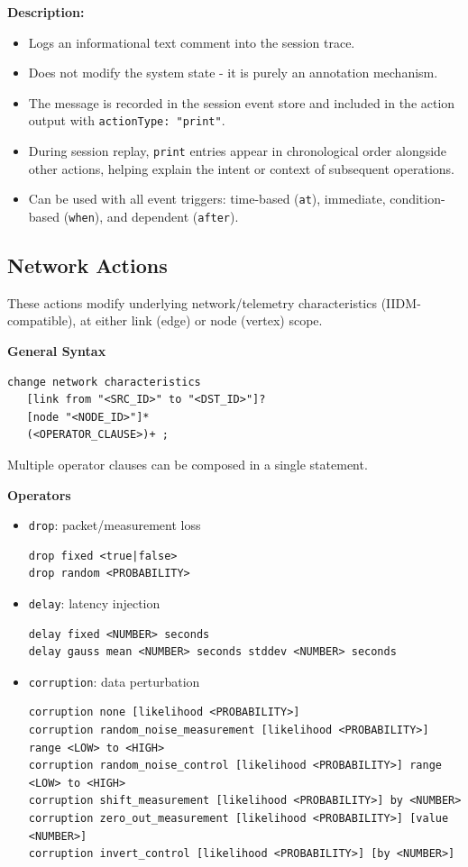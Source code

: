 \documentclass[12pt]{article}
\begin{document}
\textbf{Description:}
\begin{itemize}
  \item Logs an informational text comment into the session trace.
  \item Does not modify the system state - it is purely an annotation mechanism.
  \item The message is recorded in the session event store and included in the action output with
        \texttt{actionType: "print"}.
  \item During session replay, \texttt{print} entries appear in chronological order alongside other actions,
        helping explain the intent or context of subsequent operations.
  \item Can be used with all event triggers: time-based (\texttt{at}), immediate, condition-based
        (\texttt{when}), and dependent (\texttt{after}).
\end{itemize}

\subsection{Network Actions}

These actions modify underlying network/telemetry characteristics (IIDM-compatible), at either link (edge) or node
(vertex) scope.

\textbf{General Syntax}

\begin{lstlisting}
change network characteristics
   [link from "<SRC_ID>" to "<DST_ID>"]?
   [node "<NODE_ID>"]*
   (<OPERATOR_CLAUSE>)+ ;
\end{lstlisting}

Multiple operator clauses can be composed in a single statement.

\textbf{Operators}

\begin{itemize}
  \item \texttt{drop}: packet/measurement loss
\begin{lstlisting}
drop fixed <true|false>
drop random <PROBABILITY>
\end{lstlisting}

  \item \texttt{delay}: latency injection
\begin{lstlisting}
delay fixed <NUMBER> seconds
delay gauss mean <NUMBER> seconds stddev <NUMBER> seconds
\end{lstlisting}

  \item \texttt{corruption}: data perturbation
\begin{lstlisting}
corruption none [likelihood <PROBABILITY>]
corruption random_noise_measurement [likelihood <PROBABILITY>] range <LOW> to <HIGH>
corruption random_noise_control [likelihood <PROBABILITY>] range <LOW> to <HIGH>
corruption shift_measurement [likelihood <PROBABILITY>] by <NUMBER>
corruption zero_out_measurement [likelihood <PROBABILITY>] [value <NUMBER>]
corruption invert_control [likelihood <PROBABILITY>] [by <NUMBER>]
\end{lstlisting}
\end{itemize}
\end{document}
